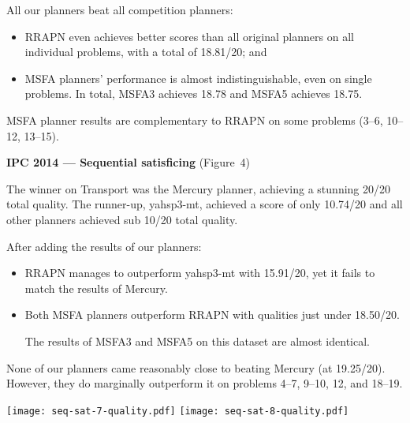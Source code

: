\documentclass[a0paper,fontscale=0.285]{baposter} %
\begin{document}
\begin{poster}
{\begin{multicols}{3}
All our planners beat all competition planners:
\begin{itemize}
\item RRAPN even achieves better scores than all original planners on all individual problems, with a total of 18.81/20; and
\item MSFA planners' performance
is almost indistinguishable, even on single problems. In total, MSFA3 achieves 18.78 and MSFA5 achieves 18.75.
\end{itemize}
MSFA planner results are complementary to RRAPN on some problems (3--6, 10--12, 13--15).

\vspace{0.15cm}
\textbf{IPC 2014 --- Sequential satisficing} (Figure~4)
\vspace{0.15cm}

The winner on Transport was the Mercury planner, achieving
a stunning 20/20 total quality. The runner-up, yahsp3-mt, achieved a score of only 10.74/20
and all other planners achieved sub 10/20 total quality.

After adding the results of our planners:
\begin{itemize}
\item RRAPN manages to outperform yahsp3-mt with 15.91/20, yet it fails
to match the results of Mercury.
\item Both MSFA planners outperform RRAPN with qualities just under 18.50/20.

The results of MSFA3 and MSFA5 on this dataset are almost identical.
\end{itemize}
None of our planners came reasonably close to beating Mercury (at 19.25/20).
However, they do marginally outperform it on problems 4--7, 9--10, 12, and 18--19.
\begin{center}
\texttt{[image: seq-sat-7-quality.pdf]}
\texttt{[image: seq-sat-8-quality.pdf]}
\end{center}
\end{multicols}
}




\end{poster}
\end{document}
